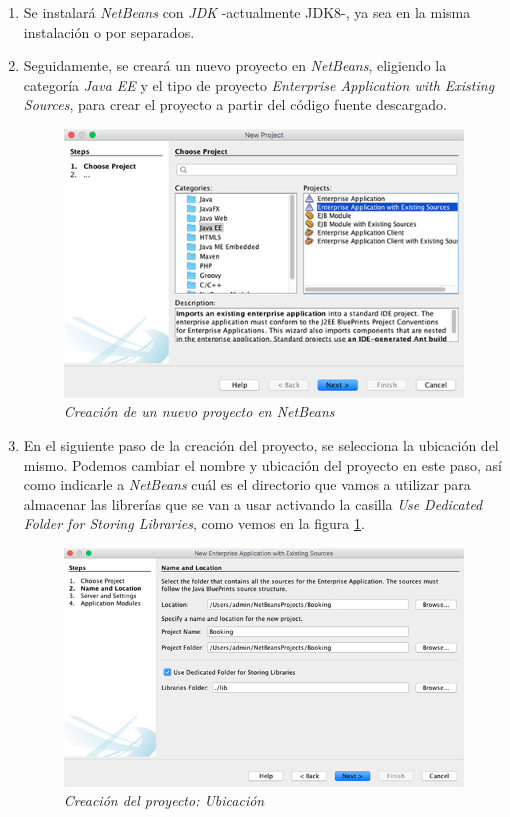 \begin{enumerate}
\item Se instalará \textit{NetBeans} con \textit{JDK} -actualmente JDK8-, ya sea en la misma instalación o por separados. 
\item Seguidamente, se creará un nuevo proyecto en \textit{NetBeans}, eligiendo la categoría \textit{Java EE} y el tipo de proyecto \textit{Enterprise Application with Existing Sources}, para crear el proyecto a partir del código fuente descargado. 

\begin{figure}
\centering
  \includegraphics[scale=.60]{img/instalacion/nuevo-proyecto.jpg}
  \caption{\textit{Creación de un nuevo proyecto en NetBeans}}
  \label{fig:nuevo-proyecto}
\end{figure}

\item En el siguiente paso de la creación del proyecto, se selecciona la ubicación del mismo. Podemos cambiar el nombre y ubicación del proyecto en este paso, así como indicarle a \textit{NetBeans} cuál es el directorio que vamos a utilizar para almacenar las librerías que se van a usar activando la casilla \textit{Use Dedicated Folder for Storing Libraries}, como vemos en la figura \ref{fig:nuevo-proyecto}.

\begin{figure}
\centering
  \includegraphics[scale=.55]{img/instalacion/ubicacion-nuevo-proyecto.jpg}
  \caption{\textit{Creación del proyecto: Ubicación}}
  \label{fig:ubicacion-nuevo-proyecto}
\end{figure}


\end{enumerate}
